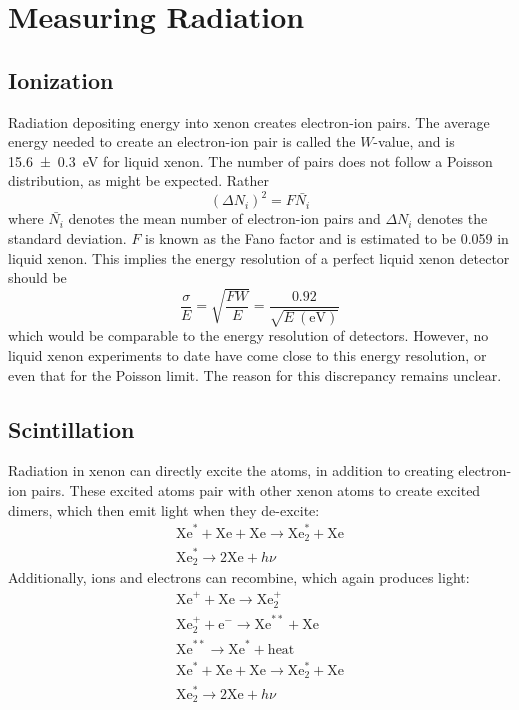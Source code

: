 \documentclass[herrin-thesis.tex]{subfiles}
\begin{document}
\section{Measuring Radiation}
\subsection{Ionization}
Radiation depositing energy into xenon creates electron-ion pairs. The average energy needed to create an electron-ion pair is called the \(W\)-value, and is \SI{15.6\pm0.3}{\eV}\cite{Takahashi:1975kx} for liquid xenon. The number of pairs does not follow a Poisson distribution, as might be expected. Rather
\begin{equation}
\left (\Delta N_i \right)^2 = F \bar{N_i}
\end{equation}
where \(\bar{N_i}\) denotes the mean number of electron-ion pairs and \(\Delta N_i\) denotes the standard deviation. \(F\) is known as the Fano factor\cite{Fano:1947ys} and is estimated to be 0.059 in liquid xenon\cite{Doke:1976vn}. This implies the energy resolution of a perfect liquid xenon detector should be
\begin{equation}
\frac{\sigma}{E} = \sqrt{\frac{F W}{E}} = \frac{0.92}{\sqrt{E~(\text{eV})}}
\end{equation}
which would be comparable to the energy resolution of  detectors. However, no liquid xenon experiments to date have come close to this energy resolution, or even that for the Poisson limit. The reason for this discrepancy remains unclear.

\subsection{Scintillation}
Radiation in xenon can directly excite the atoms, in addition to creating electron-ion pairs. These excited atoms  pair with other xenon atoms to create excited dimers, which then emit light when they de-excite:
\begin{equation}
\begin{split}
\text{Xe}^{*} + \text{Xe} + \text{Xe} \rightarrow \text{Xe}^{*}_2 + \text{Xe} \\
\text{Xe}^{*}_2 \rightarrow 2\text{Xe} + h\nu
\end{split}
\end{equation}
Additionally, ions and electrons can recombine, which again produces light:
\begin{equation}
\begin{split}
\text{Xe}^{+} + \text{Xe} \rightarrow \text{Xe}^{+}_2 \\
\text{Xe}^{+}_2 + \text{e}^{-} \rightarrow \text{Xe}^{**} + \text{Xe} \\
\text{Xe}^{**} \rightarrow \text{Xe}^{*} + \text{heat} \\
\text{Xe}^{*} + \text{Xe} + \text{Xe} \rightarrow \text{Xe}^{*}_2 + \text{Xe} \\
\text{Xe}^{*}_2 \rightarrow 2\text{Xe} + h\nu
\end{split}
\end{equation}
\end{document}
